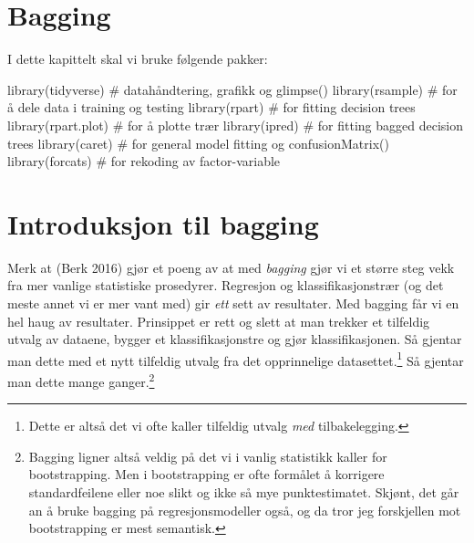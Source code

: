 \documentclass[
  letterpaper,
  DIV=11,
  numbers=noendperiod]{scrreprt}
\newenvironment{Shaded}{\begin{snugshade}}{\end{snugshade}}
\newcommand{\CommentTok}[1]{\textcolor[rgb]{0.37,0.37,0.37}{#1}}
\newcommand{\FunctionTok}[1]{\textcolor[rgb]{0.28,0.35,0.67}{#1}}
\newcommand{\NormalTok}[1]{\textcolor[rgb]{0.00,0.23,0.31}{#1}}
\begin{document}

\chapter{Bagging}\label{bagging}

I dette kapittelt skal vi bruke følgende pakker:

\begin{Shaded}
\begin{Highlighting}[]
\FunctionTok{library}\NormalTok{(tidyverse)   }\CommentTok{\# datahåndtering, grafikk og glimpse()}
\FunctionTok{library}\NormalTok{(rsample)     }\CommentTok{\# for å dele data i training og testing}
\FunctionTok{library}\NormalTok{(rpart)       }\CommentTok{\# for fitting decision trees}
\FunctionTok{library}\NormalTok{(rpart.plot)  }\CommentTok{\# for å plotte trær}
\FunctionTok{library}\NormalTok{(ipred)       }\CommentTok{\# for fitting bagged decision trees}
\FunctionTok{library}\NormalTok{(caret)       }\CommentTok{\# for general model fitting og confusionMatrix()}
\FunctionTok{library}\NormalTok{(forcats)     }\CommentTok{\# for rekoding av factor{-}variable}
\end{Highlighting}
\end{Shaded}


\chapter{Introduksjon til bagging}\label{introduksjon-til-bagging}

Merk at (Berk 2016) gjør et poeng av at med \emph{bagging} gjør vi et
større steg vekk fra mer vanlige statistiske prosedyrer. Regresjon og
klassifikasjonstrær (og det meste annet vi er mer vant med) gir
\emph{ett} sett av resultater. Med bagging får vi en hel haug av
resultater. Prinsippet er rett og slett at man trekker et tilfeldig
utvalg av dataene, bygger et klassifikasjonstre og gjør
klassifikasjonen. Så gjentar man dette med et nytt tilfeldig utvalg fra
det opprinnelige datasettet.\footnote{Dette er altså det vi ofte kaller
  tilfeldig utvalg \emph{med} tilbakelegging.} Så gjentar man dette
mange ganger.\footnote{Bagging ligner altså veldig på det vi i vanlig
  statistikk kaller for bootstrapping. Men i bootstrapping er ofte
  formålet å korrigere standardfeilene eller noe slikt og ikke så mye
  punktestimatet. Skjønt, det går an å bruke bagging på
  regresjonsmodeller også, og da tror jeg forskjellen mot bootstrapping
  er mest semantisk.}
\end{document}
